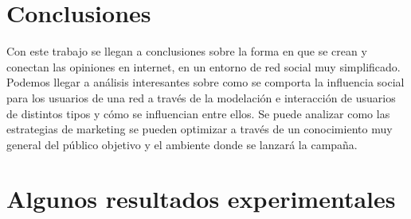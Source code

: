 \documentclass[acmtog]{acmart}
\begin{document}
\section{Conclusiones}
Con este trabajo se llegan a conclusiones sobre la forma en que se crean y conectan las opiniones en internet, en un entorno de red social muy simplificado. Podemos llegar a análisis interesantes sobre como se comporta la influencia social para los usuarios de una red a través de la modelación e interacción de usuarios de distintos tipos y cómo se influencian entre ellos. Se puede analizar como las estrategias de marketing se pueden optimizar a través de un conocimiento muy general del público objetivo y el ambiente donde se lanzará la campaña.

\section{Algunos resultados experimentales}
\end{document}
